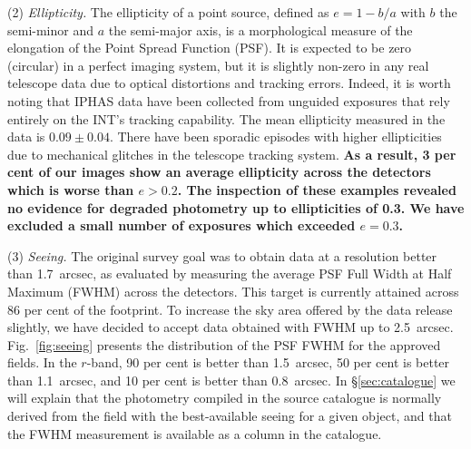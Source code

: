 \documentclass[a4paper,useAMS,usenatbib]{mn2e}
\begin{document}
(2) \emph{Ellipticity.} 
The ellipticity of a point source,
defined as $e = 1 - b / a$ 
with $b$ the semi-minor and $a$ the semi-major axis,
is a morphological measure of the elongation
of the Point Spread Function (PSF).
It is expected to be zero (circular)
in a perfect imaging system,
but it is slightly non-zero in any real telescope data 
due to optical distortions and tracking errors.
Indeed, it is worth noting
that IPHAS data have been collected
from unguided exposures that rely entirely
on the INT's tracking capability.
The mean ellipticity measured
in the data is $0.09\pm0.04$.
There have been sporadic episodes with higher ellipticities
due to mechanical glitches in the telescope tracking system.
{ \bf As a result, 3 per cent of our images show an
average ellipticity across the detectors which is worse
than $e > 0.2$.
The inspection of these examples revealed no evidence
for degraded photometry up to ellipticities of 0.3.
We have excluded a small number of exposures
which exceeded $e = 0.3$.}

(3) \emph{Seeing.} 
The original survey goal was to obtain data 
at a resolution better than 1.7~arcsec,
as evaluated by measuring the average PSF Full Width at Half Maximum (FWHM)
across the detectors.
This target is currently attained across 86 per cent of the footprint.
To increase the sky area offered by the data release slightly,
we have decided to accept data obtained with FWHM up to 2.5~arcsec.
Fig.~\ref{fig:seeing} presents the distribution
of the PSF FWHM for the approved fields.
In the $r$-band, 90 per cent is better than 1.5~arcsec,
50 per cent is better than 1.1~arcsec,
and 10 per cent is better than 0.8~arcsec.
In \S\ref{sec:catalogue} we will explain
that the photometry compiled in the source catalogue
is normally derived from the field with the
best-available seeing for a given object,
and that the FWHM measurement
is available as a column in the catalogue.
\end{document}
